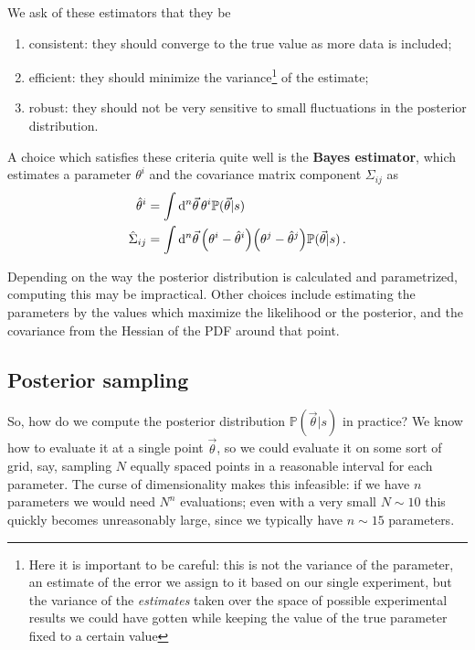 \documentclass[main.tex]{subfiles}
\begin{document}
We ask of these estimators that they be 
\begin{enumerate}
    \item consistent: they should converge to the true value as more data is included;
    \item efficient: they should minimize the variance\footnote{Here it is important to be careful: this is not the variance of the parameter, an estimate of the error we assign to it based on our single experiment, but the variance of the \emph{estimates} taken over the space of possible experimental results we could have gotten while keeping the value of the true parameter fixed to a certain value} of the estimate;
    \item robust: they should not be very sensitive to small fluctuations in the posterior distribution.
\end{enumerate}

A choice which satisfies these criteria quite well is the \textbf{Bayes estimator}, which estimates a parameter \(\theta^{i}\) and the covariance matrix component \(\Sigma_{ij}\) as 
%
\begin{subequations}
\begin{align}
\hat{\theta}^{i} &= \int \dd[n]{\vec{\theta} } \theta^{i}\mathbb{P}(\vec{\theta} | s)  \\
\hat{\Sigma}_{ij} &= \int \dd[n]{\vec{\theta}} 
\qty(\theta^{i}  - \hat{\theta}^{i})
\qty(\theta^{j}  - \hat{\theta}^{j}) 
\mathbb{P}(\vec{\theta} | s)
\,.
\end{align}
\end{subequations}

Depending on the way the posterior distribution is calculated and parametrized, computing this may be impractical.
Other choices include estimating the parameters by the values which maximize the likelihood or the posterior, and the covariance from the Hessian of the \ac{PDF} around that point. 

\subsection{Posterior sampling}

So, how do we compute the posterior distribution \(\mathbb{P}(\vec{\theta} | s)\) in practice? We know how to evaluate it at a single point \(\vec{\theta}\), so we could evaluate it on some sort of grid, say, sampling \(N\) equally spaced points in a reasonable interval for each parameter.
The curse of dimensionality makes this infeasible: if we have \(n\) parameters we would need \(N^{n}\) evaluations; even with a very small \(N \sim 10\) this quickly becomes unreasonably large, since we typically have \(n \sim 15\) parameters. 
\end{document}
